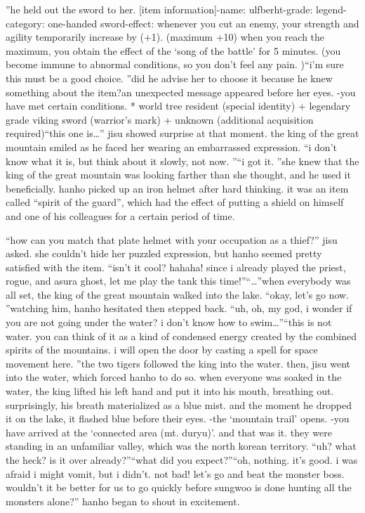 ”he held out the sword to her.
[item information]-name: ulfberht-grade: legend-category: one-handed sword-effect: whenever you cut an enemy, your strength and agility temporarily increase by (+1).
 (maximum +10) when you reach the maximum, you obtain the effect of the ‘song of the battle’ for 5 minutes.
 (you become immune to abnormal conditions, so you don’t feel any pain.
)“i’m sure this must be a good choice.
”did he advise her to choose it because he knew something about the item?an unexpected message appeared before her eyes.
-you have met certain conditions.
* world tree resident (special identity) + legendary grade viking sword (warrior’s mark) + unknown (additional acquisition required)“this one is…” jisu showed surprise at that moment.
the king of the great mountain smiled as he faced her wearing an embarrassed expression.
“i don’t know what it is, but think about it slowly, not now.
”“i got it.
”she knew that the king of the great mountain was looking farther than she thought, and he used it beneficially.
hanho picked up an iron helmet after hard thinking.
 it was an item called “spirit of the guard”, which had the effect of putting a shield on himself and one of his colleagues for a certain period of time.


“how can you match that plate helmet with your occupation as a thief?” jisu asked.
she couldn’t hide her puzzled expression, but hanho seemed pretty satisfied with the item.
“isn’t it cool? hahaha! since i already played the priest, rogue, and asura ghost, let me play the tank this time!”“…”when everybody was all set, the king of the great mountain walked into the lake.
“okay, let’s go now.
”watching him, hanho hesitated then stepped back.
“uh, oh, my god, i wonder if you are not going under the water? i don’t know how to swim…”“this is not water.
 you can think of it as a kind of condensed energy created by the combined spirits of the mountains.
 i will open the door by casting a spell for space movement here.
”the two tigers followed the king into the water.
 then, jisu went into the water, which forced hanho to do so.
when everyone was soaked in the water, the king lifted his left hand and put it into his mouth, breathing out.
 surprisingly, his breath materialized as a blue mist.
 and the moment he dropped it on the lake, it flashed blue before their eyes.
-the ‘mountain trail’ opens.
-you have arrived at the ‘connected area (mt.
 duryu)’.
and that was it.
 they were standing in an unfamiliar valley, which was the north korean territory.
“uh? what the heck? is it over already?”“what did you expect?”“oh, nothing.
 it’s good.
 i was afraid i might vomit, but i didn’t.
 not bad! let’s go and beat the monster boss.
 wouldn’t it be better for us to go quickly before sungwoo is done hunting all the monsters alone?” hanho began to shout in excitement.


 